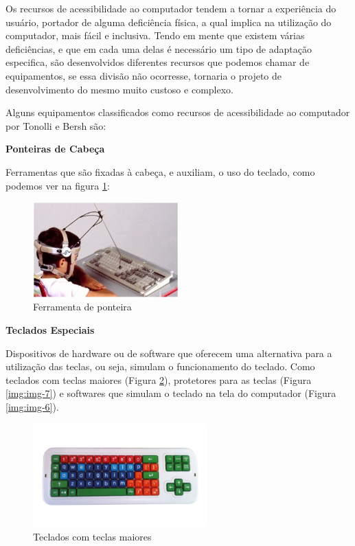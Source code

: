 \documentclass[
	12pt,			%
	openright,		%
	oneside,			%
	a4paper,			%
	chapter=TITLE,		%
	english,			%
	brazil,			%
	]{abntex2}
\begin{document}
Os recursos de acessibilidade ao computador tendem a tornar a experiência do usuário, portador de alguma deficiência física, a qual implica na utilização do computador, mais fácil e inclusiva. Tendo em mente que existem várias deficiências, e que em cada uma delas é necessário um tipo de adaptação especifica, são desenvolvidos diferentes recursos que podemos chamar de equipamentos, se essa divisão não ocorresse, tornaria o projeto de desenvolvimento do mesmo muito custoso e complexo. 

Alguns equipamentos classificados como recursos de acessibilidade ao computador por Tonolli e Bersh são:

\textbf{Ponteiras de Cabeça}

Ferramentas que são fixadas à cabeça, e auxiliam, o uso do teclado, como podemos ver na figura \ref{img:img-12}:

\begin{figure}[H]
	\centering
		\includegraphics[width=0.5\textwidth]{./img/img-12.jpg}
		\caption{Ferramenta de ponteira}
		\label{img:img-12}
\end{figure}

\textbf{Teclados Especiais}

Dispositivos de hardware ou de software que oferecem uma alternativa para a utilização das teclas, ou seja, simulam o funcionamento do teclado. Como teclados com teclas maiores (Figura \ref{img:img-5}), protetores para as teclas (Figura \ref{img:img-7}) e softwares que simulam o teclado na tela do computador (Figura \ref{img:img-6}).

\begin{figure}[H]
	\centering
		\includegraphics[width=0.6\textwidth]{./img/img-5.png}
		\caption{Teclados com teclas maiores}
		\label{img:img-5}
\end{figure}
\end{document}
